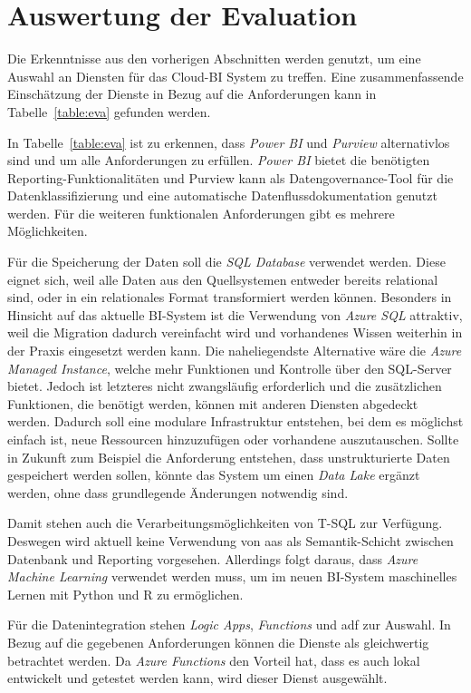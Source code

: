 \section{Auswertung der Evaluation} \label{sec:konzeption:evaAuswertung}
Die Erkenntnisse aus den vorherigen Abschnitten werden genutzt, um eine Auswahl an Diensten für das Cloud-BI System zu treffen. Eine zusammenfassende Einschätzung der Dienste in Bezug auf die Anforderungen kann in Tabelle~\ref{table:eva} gefunden werden.


In Tabelle~\ref{table:eva} ist zu erkennen, dass \textit{Power BI} und \textit{Purview} alternativlos sind und um alle Anforderungen zu erfüllen. \textit{Power BI} bietet die benötigten Reporting-Funktionalitäten und Purview kann als Datengovernance-Tool für die Datenklassifizierung und eine automatische Datenflussdokumentation genutzt werden. Für die weiteren funktionalen Anforderungen gibt es mehrere Möglichkeiten. 

Für die Speicherung der Daten soll die \textit{SQL Database} verwendet werden. Diese eignet sich, weil alle Daten aus den Quellsystemen entweder bereits relational sind, oder in ein relationales Format transformiert werden können. Besonders in Hinsicht auf das aktuelle BI-System ist die Verwendung von \textit{Azure SQL} attraktiv, weil die Migration dadurch vereinfacht wird und vorhandenes Wissen weiterhin in der Praxis eingesetzt werden kann. Die naheliegendste Alternative wäre die \textit{Azure Managed Instance}, welche mehr Funktionen und Kontrolle über den SQL-Server bietet. Jedoch ist letzteres nicht zwangsläufig erforderlich und die zusätzlichen Funktionen, die benötigt werden, können mit anderen Diensten abgedeckt werden. Dadurch soll eine modulare Infrastruktur entstehen, bei dem es möglichst einfach ist, neue Ressourcen hinzuzufügen oder vorhandene auszutauschen. Sollte in Zukunft zum Beispiel die Anforderung entstehen, dass unstrukturierte Daten gespeichert werden sollen, könnte das System um einen \textit{Data Lake} ergänzt werden, ohne dass grundlegende Änderungen notwendig sind.

Damit stehen auch die Verarbeitungsmöglichkeiten von T-SQL zur Verfügung. Deswegen wird aktuell keine Verwendung von \ac{aas} als Semantik-Schicht zwischen Datenbank und Reporting vorgesehen. Allerdings folgt daraus, dass \textit{Azure Machine Learning} verwendet werden muss, um im neuen BI-System maschinelles Lernen mit Python und R zu ermöglichen.

Für die Datenintegration stehen \textit{Logic Apps}, \textit{Functions} und \ac{adf} zur Auswahl. In Bezug auf die gegebenen Anforderungen können die Dienste als gleichwertig betrachtet werden. Da \textit{Azure Functions} den Vorteil hat, dass es auch lokal entwickelt und getestet werden kann, wird dieser Dienst ausgewählt.

